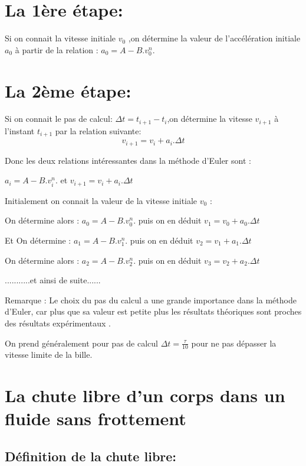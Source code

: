 \documentclass[12pt]{article}
\begin{document}
\section*{La 1ère étape:}

Si on connait la vitesse initiale $v_0$ ,on détermine la valeur de l'accélération initiale $a_0$ à partir de la relation : $a_0 = A-B.v^n_0$.

\section*{La 2ème étape:}
Si on connait le pas de calcul: $\Delta{t} = t_{i+1} - t_i$,on détermine la vitesse $v_{i+1}$ à l'instant $t_{i+1}$ par la relation suivante: $$v_{i+1} = v_i + a_i.\Delta{t}$$

Donc les deux relations intéressantes dans la méthode d'Euler sont : 

 $a_i = A-B.v^n_i$.  et $v_{i+1} = v_i + a_i.\Delta{t}$


 Initialement on connait la valeur de la vitesse initiale $v_0$ : 

 On détermine alors :  $a_0 = A-B.v^n_0$.  puis on en déduit $v_{1} = v_0 + a_0.\Delta{t}$
 
 Et On détermine  :  $a_1 = A-B.v^n_1$.  puis on en déduit $v_{2} = v_1 + a_1.\Delta{t}$
 
 On détermine alors :  $a_2 = A-B.v^n_2$.  puis on en déduit $v_{3} = v_2 + a_2.\Delta{t}$

 ...........et ainsi de suite......


 \begin{tcolorbox}
Remarque :
Le choix du pas du calcul a une grande importance dans la méthode d'Euler, car plus que sa valeur est petite plus
les résultats théoriques sont proches des résultats expérimentaux .

On prend généralement pour pas de calcul $\Delta{t} = \frac{\tau}{10}$ pour ne pas dépasser la vitesse limite de la bille.

 \end{tcolorbox}

 \section{La chute libre d'un corps dans un fluide sans frottement}
 \subsection{Définition de la chute libre:}
\end{document}
